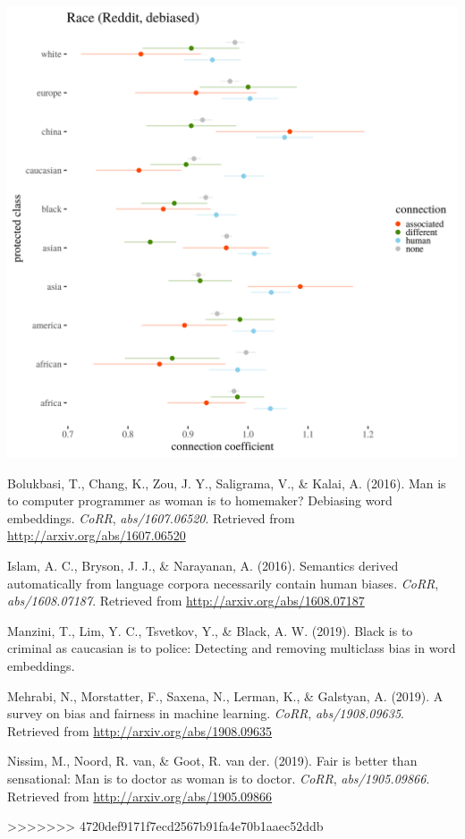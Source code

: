 \documentclass[12pt,]{book}
\begin{document}
\includegraphics[width=14cm]{../images/visDebRaceReddit.png}

\hypertarget{refs}{}
\hypertarget{ref-Bolukbasi2016Man}{}
Bolukbasi, T., Chang, K., Zou, J. Y., Saligrama, V., \& Kalai, A.
(2016). Man is to computer programmer as woman is to homemaker?
Debiasing word embeddings. \emph{CoRR}, \emph{abs/1607.06520}. Retrieved
from \url{http://arxiv.org/abs/1607.06520}

\hypertarget{ref-Caliskan2017Semantics}{}
Islam, A. C., Bryson, J. J., \& Narayanan, A. (2016). Semantics derived
automatically from language corpora necessarily contain human biases.
\emph{CoRR}, \emph{abs/1608.07187}. Retrieved from
\url{http://arxiv.org/abs/1608.07187}

\hypertarget{ref-manzini2019black}{}
Manzini, T., Lim, Y. C., Tsvetkov, Y., \& Black, A. W. (2019). Black is
to criminal as caucasian is to police: Detecting and removing multiclass
bias in word embeddings.

\hypertarget{ref-Mehrabi2019Survey}{}
Mehrabi, N., Morstatter, F., Saxena, N., Lerman, K., \& Galstyan, A.
(2019). A survey on bias and fairness in machine learning. \emph{CoRR},
\emph{abs/1908.09635}. Retrieved from
\url{http://arxiv.org/abs/1908.09635}

\hypertarget{ref-Nissim2019Fair}{}
Nissim, M., Noord, R. van, \& Goot, R. van der. (2019). Fair is better
than sensational: Man is to doctor as woman is to doctor. \emph{CoRR},
\emph{abs/1905.09866}. Retrieved from
\url{http://arxiv.org/abs/1905.09866}

>>>>>>> 4720def9171f7ecd2567b91fa4e70b1aaec52ddb
\end{document}
